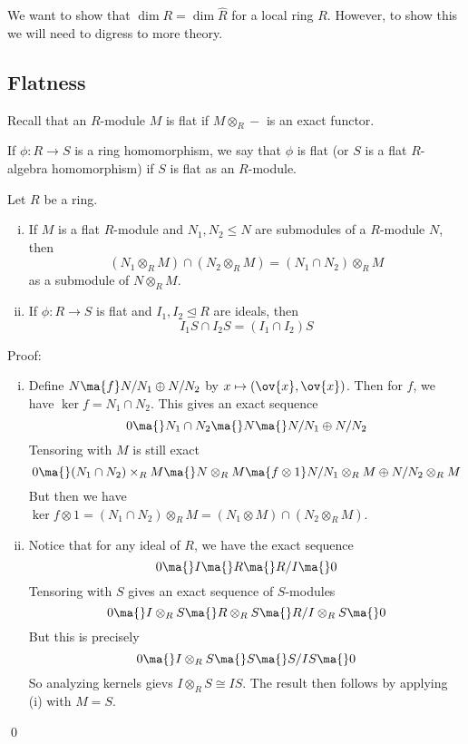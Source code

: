 We want to show that $\dim R=\dim \hat{R}$ for a local ring $R$. However, to show this we will need to digress to more theory. 

\subsection{Flatness}

Recall that an $R$-module $M$ is flat if $M \otimes_R -$ is an exact functor. 

\begin{dfn}
If $\phi: R \to S$ is a ring homomorphism, we say that $\phi$ is flat (or $S$ is a flat $R$-algebra homomorphism) if $S$ is flat as an $R$-module. 
\end{dfn}

\begin{lem}
Let $R$ be a ring. 
\begin{enumerate}[(i)]
\item If $M$ is a flat $R$-module and $N_1,N_2 \leq N$ are submodules of a $R$-module $N$, then
\[
(N_1 \otimes_R M) \cap (N_2 \otimes_R M)=(N_1 \cap N_2) \otimes_R M
\]
as a submodule of $N \otimes_R M$.
\item If $\phi: R \to S$ is flat and $I_1,I_2 \unlhd R$ are ideals, then 
\[
I_1 S \cap I_2 S = (I_1 \cap I_2)S
\]
\end{enumerate}
\end{lem}

\noindent Proof: 
\begin{enumerate}[(i)]
\item Define $N \ma{f} N/N_1 \oplus N/N_2$ by $x \mapsto (\ov{x},\ov{x})$. Then for $f$, we have $\ker f = N_1 \cap N_2$. This gives an exact sequence
\[
0 \ma{} N_1 \cap N_2 \ma{} N \ma{} N/N_1 \oplus N/N_2
\]
Tensoring with $M$ is still exact
\[
0 \ma{} (N_1 \cap N_2) \times_R M \ma{} N \otimes_R M \ma{f \otimes 1} N/N_1 \otimes_R M \oplus N/N_2 \otimes_R M
\]
But then we have $\ker f \otimes 1=(N_1 \cap N_2) \otimes_R M=(N_1 \otimes M) \cap (N_2 \otimes_R M)$.

\item Notice that for any ideal of $R$, we have the exact sequence
\[
0 \ma{} I \ma{} R \ma{} R/I \ma{} 0
\]
Tensoring with $S$ gives an exact sequence of $S$-modules
\[
0 \ma{} I \otimes_R S \ma{} R \otimes_R S \ma{} R/I \otimes_R S \ma{} 0
\]
But this is precisely 
\[
0 \ma{} I \otimes_R S \ma{} S \ma{} S/IS \ma{} 0
\]
So analyzing kernels gievs $I \otimes_R S \cong IS$. The result then follows by applying (i) with $M=S$. 
\end{enumerate}
\qed \\

